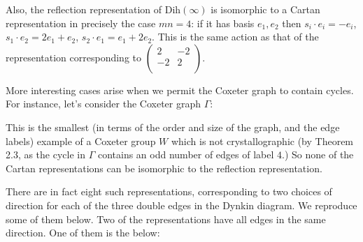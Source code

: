 \documentclass[11pt,a4paper]{report}
\theoremstyle{definition}
\begin{document}
Also, the reflection representation of $\text{Dih}(\infty)$ is isomorphic to a Cartan representation in precisely the case $mn = 4$: if it has basis $e_1, e_2$ then $s_i \cdot e_i = -e_i$, $s_1 \cdot e_2 = 2e_1 + e_2$,  $s_2 \cdot e_1 = e_1 + 2e_2$. This is the same action as that of the representation corresponding to $\begin{pmatrix}2 & -2\\-2 & 2\\\end{pmatrix}$. 

More interesting cases arise when we permit the Coxeter graph to contain cycles. For instance, let's consider the Coxeter graph $\Gamma$: 

 \begin{figure}[h]
\centering
{}
\end{figure}

This is the smallest (in terms of the order and size of the graph, and the edge labels) example of a Coxeter group $W$ which is not crystallographic (by Theorem 2.3, as the cycle in $\Gamma$ contains an odd number of edges of label $4$.) So none of the Cartan representations can be isomorphic to the reflection representation.

There are in fact eight such representations, corresponding to two choices of direction for each of the three double edges in the Dynkin diagram. We reproduce some of them below. Two of the representations have all edges in the same direction. One of them is the below:

\begin{figure}[h]
\centering

\end{figure}
\end{document}
